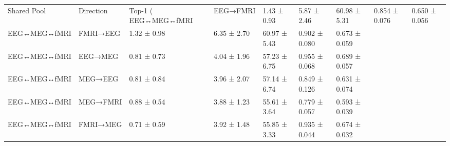 \begin{tabular}{lllllll}
\toprule
Shared Pool & Direction & Top-1 (%
\midrule
EEG↔MEG↔fMRI & EEG→FMRI & 1.43 ± 0.93 & 5.87 ± 2.46 & 60.98 ± 5.31 & 0.854 ± 0.076 & 0.650 ± 0.056 \\
EEG↔MEG↔fMRI & FMRI→EEG & 1.32 ± 0.98 & 6.35 ± 2.70 & 60.97 ± 5.43 & 0.902 ± 0.080 & 0.673 ± 0.059 \\
EEG↔MEG↔fMRI & EEG→MEG & 0.81 ± 0.73 & 4.04 ± 1.96 & 57.23 ± 6.75 & 0.955 ± 0.068 & 0.689 ± 0.057 \\
EEG↔MEG↔fMRI & MEG→EEG & 0.81 ± 0.84 & 3.96 ± 2.07 & 57.14 ± 6.74 & 0.849 ± 0.126 & 0.631 ± 0.074 \\
EEG↔MEG↔fMRI & MEG→FMRI & 0.88 ± 0.54 & 3.88 ± 1.23 & 55.61 ± 3.64 & 0.779 ± 0.057 & 0.593 ± 0.039 \\
EEG↔MEG↔fMRI & FMRI→MEG & 0.71 ± 0.59 & 3.92 ± 1.48 & 55.85 ± 3.33 & 0.935 ± 0.044 & 0.674 ± 0.032 \\
\bottomrule
\end{tabular}
